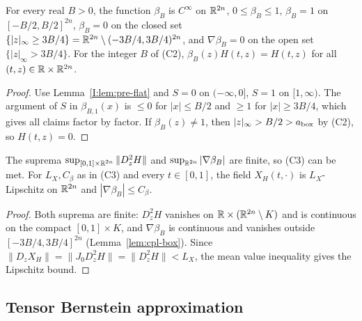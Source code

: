 \begin{lemma}\label{lem:cpl-box}
For every real $B>0$, the function $\beta_B$ is $C^\infty$ on $\mathbb{R}^{2n}$, $0\le\beta_B\le1$, $\beta_B=1$ on
$[-B/2,B/2]^{2n}$, $\beta_B=0$ on the closed set $\{|z|_\infty\ge3B/4\}=\mathbb{R}^{2n}\setminus(-3B/4,3B/4)^{2n}$, and
$\nabla\beta_B=0$ on the open set $\{|z|_\infty>3B/4\}$. For the integer $B$ of (C2),
$\beta_B(z)H(t,z)=H(t,z)$ for all $(t,z)\in\mathbb{R}\times\mathbb{R}^{2n}$.
\end{lemma}

\begin{proof}
Use Lemma~\ref{I:lem:pre-flat} and $S=0$ on $(-\infty,0]$, $S=1$ on $[1,\infty)$. The argument of $S$ in $\beta_{B,1}(x)$ is $\le0$ for $|x|\le B/2$ and $\ge1$ for $|x|\ge3B/4$, which gives all claims factor by factor. If $\beta_B(z)\ne1$, then $|z|_\infty>B/2>a_{\rm box}$ by (C2), so $H(t,z)=0$.
\end{proof}

\begin{lemma}\label{lem:cpl-lipschitz}
The suprema $\sup_{[0,1]\times\mathbb{R}^{2n}}\|D_z^2H\|$ and $\sup_{\mathbb{R}^{2n}}|\nabla\beta_B|$ are finite, so (C3) can be met.
For $L_X,C_\beta$ as in (C3) and every $t\in[0,1]$, the field $X_H(t,\cdot)$ is $L_X$-Lipschitz on $\mathbb{R}^{2n}$ and
$|\nabla\beta_B|\le C_\beta$.
\end{lemma}

\begin{proof}
Both suprema are finite: $D_z^2H$ vanishes on $\mathbb{R}\times(\mathbb{R}^{2n}\setminus K)$ and is continuous on the compact $[0,1]\times K$, and $\nabla\beta_B$ is continuous and vanishes outside $[-3B/4,3B/4]^{2n}$ (Lemma~\ref{lem:cpl-box}). Since $\|D_zX_H\|=\|J_0D_z^2H\|=\|D_z^2H\|<L_X$, the mean value inequality gives the Lipschitz bound.
\end{proof}

\subsection{Tensor Bernstein approximation}\label{sec:cpl-bernstein}

